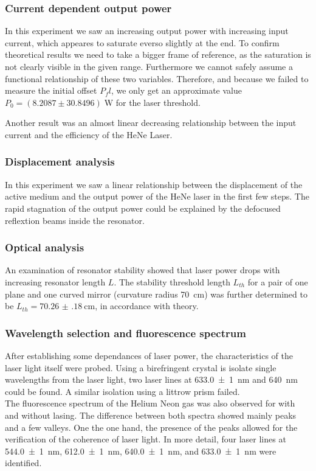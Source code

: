 \documentclass[../main.tex]{subfiles}
\begin{document}
    \subsubsection*{Current dependent output power}
        In this experiment we saw an increasing output power with increasing input current, which appeares to saturate everso slightly at the end. To confirm theoretical results we need to take a bigger frame of reference, as the saturation is not clearly visible in the given range. Furthermore we cannot safely assume a functional relationship of these two variables. Therefore, and because we failed to measure the initial offset $P_fl$, we only get an approximate value $P_0 = (8.2087\pm 30.8496)\;\si{\W}$ for the laser threshold.

        Another result was an almost linear decreasing relationship between the input current and the efficiency of the HeNe Laser. 

    \subsubsection*{Displacement analysis}
        In this experiment we saw a linear relationship between the displacement of the active medium and the output power of the HeNe laser in the first few steps. The rapid stagnation of the output power could be explained by the defocused reflextion beams inside the resonator. 


    \subsubsection*{Optical analysis}
        An examination of resonator stability showed that laser power drops with increasing resonator length $L$. The stability threshold length $L_{th}$ for a pair of one plane and one curved mirror (curvature radius \SI{70}{\cm}) was further determined to be $L_{th} = \SI{70.26(18)}{\cm}$, in accordance with theory.

    \subsubsection*{Wavelength selection and fluorescence spectrum}
        After establishing some dependances of laser power, the characteristics of the laser light itself were probed. Using a birefringent crystal is isolate single wavelengths from the laser light, two laser lines at \SI{633.0(10)}{\nm} and \SI{640}{\nm} could be found. A similar isolation using a littrow prism failed.\\
        
        \noindent The fluorescence spectrum of the Helium Neon gas was also observed for with and without lasing. The difference between both spectra showed mainly peaks and a few valleys. One the one hand, the presence of the peaks allowed for the verification of the coherence of laser light. In more detail, four laser lines at \SI{544.0(10)}{\nm}, \SI{612.0(10)}{\nm}, \SI{640.0(10)}{\nm}, and \SI{633.0(10)}{\nm} were identified.
\end{document}
